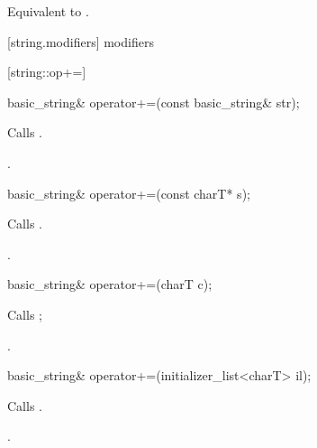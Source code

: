 \begin{itemdescr}
\pnum
\requires
{}

\pnum
\effects
Equivalent to .
\end{itemdescr}

[string.modifiers]{ modifiers}

[string::op+=]{}

%
%
\begin{itemdecl}
basic_string&
  operator+=(const basic_string& str);
\end{itemdecl}

\begin{itemdescr}
\pnum
\effects Calls .

\pnum
\returns
{}.
\end{itemdescr}

%
%
\begin{itemdecl}
basic_string& operator+=(const charT* s);
\end{itemdecl}

\begin{itemdescr}
\pnum
\effects Calls .

\pnum
\returns
{}.
\end{itemdescr}

%
%
\begin{itemdecl}
basic_string& operator+=(charT c);
\end{itemdecl}

\begin{itemdescr}
\pnum
\effects Calls ;

\pnum
\returns
{}.
\end{itemdescr}

%
%
\begin{itemdecl}
basic_string& operator+=(initializer_list<charT> il);
\end{itemdecl}

\begin{itemdescr}
\pnum
\effects Calls .

\pnum
\returns {}.
\end{itemdescr}


